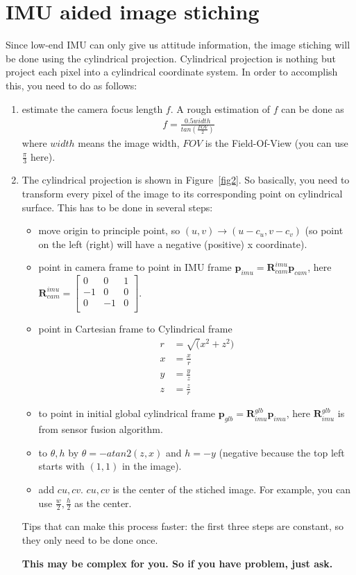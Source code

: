 \documentclass[a4paper]{article}
\begin{document}
\section{IMU aided image stiching}
Since low-end IMU can only give us attitude information, the image stiching will be done using the cylindrical projection. Cylindrical projection is nothing but project each pixel into a cylindrical coordinate system. In order to accomplish this, you need to do as follows:
\begin{enumerate}
\item estimate the camera focus length $f$. A rough estimation of $f$ can be done as
\begin{align*}
f = \frac{0.5width}{tan(\frac{FOV}{2})}
\end{align*}
where $width$ means the image width, $FOV$ is the Field-Of-View (you can use $\frac{\pi}{3}$ here).
\item The cylindrical projection is shown in Figure~\ref{fig2}. So basically, you need to transform every pixel of the image to its corresponding point on cylindrical surface. This has to be done in several steps:
\begin{itemize}
\item move origin to principle point, so $(u,v)\to (u-c_u,v-c_v)$ (so point on the left (right) will have a negative (positive) x coordinate).
\item point in camera frame to point in IMU frame $\mathbf{p}_{imu}=\mathbf{R}_{cam}^{imu}\mathbf{p}_{cam}$, here $\mathbf{R}_{cam}^{imu}=\left[\begin{matrix}
0&0&1\\-1&0&0\\0&-1&0\\
\end{matrix}\right]$.
\item point in Cartesian frame to Cylindrical frame
\begin{align*}
r &= \sqrt(x^2+z^2) \\
x &= \frac{x}{r} \\
y &= \frac{y}{z}  \\
z &= \frac{z}{r}
\end{align*}
\item to point in initial global cylindrical frame $\mathbf{p}_{glb}=\mathbf{R}_{imu}^{glb}\mathbf{p}_{imu}$, here $\mathbf{R}_{imu}^{glb}$ is from sensor fusion algorithm.
\item to $\theta,h$ by $\theta=-atan2(z,x)$ and $h=-y$ (negative because the top left starts with $(1,1)$ in the image).
\item add $cu,cv$. $cu,cv$ is the center of the stiched image. For example, you can use $\frac{w}{2},\frac{h}{2}$ as the center.
\end{itemize}
Tips that can make this process faster: the first three steps are constant, so they only need to be done once.

\textbf{This may be complex for you. So if you have problem, just ask.}

\end{enumerate}
\end{document}
